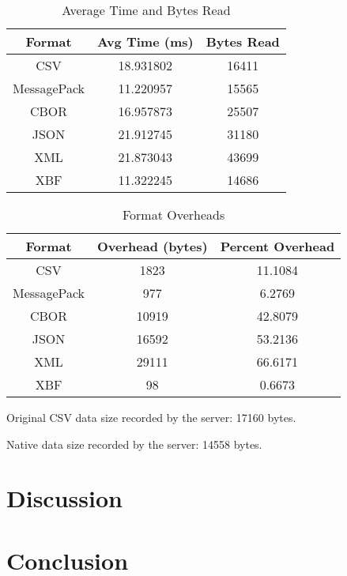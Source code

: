 \documentclass[conference]{IEEEtran}
\begin{document}
\begin{table}[htbp]
	\caption{Average Time and Bytes Read}
	\begin{center}
		\begin{tabular}{|c|c|c|}
			\hline
			\textbf{Format} & \textbf{Avg Time (ms)} & \textbf{Bytes Read} \\
			\hline
			CSV             & 18.931802              & 16411               \\
			MessagePack     & 11.220957              & 15565               \\
			CBOR            & 16.957873              & 25507               \\
			JSON            & 21.912745              & 31180               \\
			XML             & 21.873043              & 43699               \\
			XBF             & 11.322245              & 14686               \\
			\hline
		\end{tabular}
	\end{center}\label{time_and_bytes}
\end{table}

\begin{table}[htbp]
	\caption{Format Overheads}
	\begin{center}
		\begin{tabular}{|c|c|c|}
			\hline
			\textbf{Format} & \textbf{Overhead (bytes)} & \textbf{Percent Overhead} \\
			\hline
			CSV             & 1823                      & 11.1084                   \\
			MessagePack     & 977                       & 6.2769                    \\
			CBOR            & 10919                     & 42.8079                   \\
			JSON            & 16592                     & 53.2136                   \\
			XML             & 29111                     & 66.6171                   \\
			XBF             & 98                        & 0.6673                    \\
			\hline
		\end{tabular}
	\end{center}\label{overhead}
\end{table}

Original CSV data size recorded by the server: 17160 bytes.

Native data size recorded by the server: 14558 bytes.

\section{Discussion}

\section{Conclusion}



\end{document}
